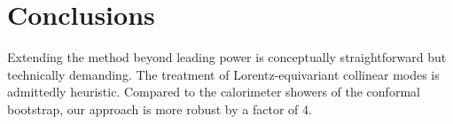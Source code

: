 \section{Conclusions}\label{sec:conclusions}

Extending the method beyond leading power is conceptually
straightforward but technically demanding. The treatment of
Lorentz-equivariant collinear modes is admittedly heuristic. Compared to
the calorimeter showers of the conformal bootstrap, our approach is more
robust by a factor of 4.

